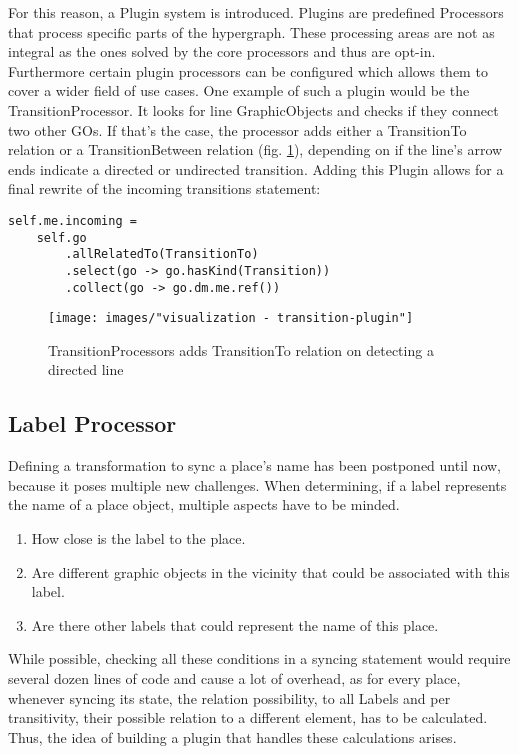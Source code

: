 For this reason, a Plugin system is introduced. Plugins are predefined Processors that process specific parts of the hypergraph. These processing areas are not as integral as the ones solved by the core processors and thus are opt-in. Furthermore certain plugin processors can be configured which allows them to cover a wider field of use cases. One example of such a plugin would be the TransitionProcessor. It looks for line GraphicObjects and checks if they connect two other GOs. If that's the case, the processor adds either a TransitionTo relation or a TransitionBetween relation (fig. \ref{fig:transition-plugin}), depending on if the line's arrow ends indicate a directed or undirected transition. Adding this Plugin allows for a final rewrite of the incoming transitions statement:

\begin{lstlisting}[language=OCL]
self.me.incoming = 
    self.go
        .allRelatedTo(TransitionTo)
        .select(go -> go.hasKind(Transition))
        .collect(go -> go.dm.me.ref())
\end{lstlisting}

\begin{figure}[ht]
\centering
\texttt{[image: images/"visualization - transition-plugin"]}
\caption{TransitionProcessors adds TransitionTo relation on detecting a directed line}
\label{fig:transition-plugin}
\end{figure}



\subsection{Label Processor}

Defining a transformation to sync a place's name has been postponed until now, because it poses multiple new challenges. When determining, if a label represents the name of a place object, multiple aspects have to be minded. 
\begin{enumerate}
  \item How close is the label to the place.
  \item Are different graphic objects in the vicinity that could be associated with this label.
  \item Are there other labels that could represent the name of this place.
\end{enumerate}

While possible, checking all these conditions in a syncing statement would require several dozen lines of code and cause a lot of overhead, as for every place, whenever syncing its state, the relation possibility, to all Labels and per transitivity, their possible relation to a different element, has to be calculated. Thus, the idea of building a plugin that handles these calculations arises.

